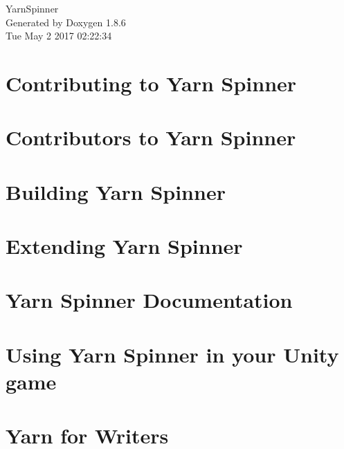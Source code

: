 \documentclass[twoside]{book}
\newcommand{\clearemptydoublepage}{%
  \newpage{\pagestyle{empty}\cleardoublepage}%
}
\begin{document}
\hypersetup{pageanchor=false}
\begin{titlepage}
\vspace*{7cm}
\begin{center}%
{\Large Yarn\-Spinner }\\
\vspace*{1cm}
{\large Generated by Doxygen 1.8.6}\\
\vspace*{0.5cm}
{\small Tue May 2 2017 02:22:34}\\
\end{center}
\end{titlepage}
\clearemptydoublepage
\tableofcontents
\clearemptydoublepage
{}
\hypersetup{pageanchor=true}

\chapter{Contributing to Yarn Spinner}
\label{d7/d46/a00002}
\hypertarget{d7/d46/a00002}{}

\chapter{Contributors to Yarn Spinner}
\label{d0/d0b/a00004}
\hypertarget{d0/d0b/a00004}{}

\chapter{Building Yarn Spinner}
\label{de/d21/a00006}
\hypertarget{de/d21/a00006}{}

\chapter{Extending Yarn Spinner}
\label{d4/dee/a00008}
\hypertarget{d4/dee/a00008}{}

\chapter{Yarn Spinner Documentation}
\label{d7/dec/a00010}
\hypertarget{d7/dec/a00010}{}

\chapter{Using Yarn Spinner in your Unity game}
\label{df/d86/a00012}
\hypertarget{df/d86/a00012}{}

\chapter{Yarn for Writers}
\label{d2/de7/a00014}
\hypertarget{d2/de7/a00014}{}

\end{document}
